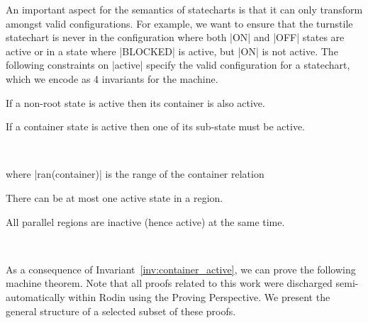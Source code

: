 An important aspect for the semantics of statecharts is that it can only transform amongst valid configurations.  For example, we want to ensure that the turnstile statechart is never in the configuration where both |ON| and |OFF| states are active or in a state where |BLOCKED| is active, but |ON| is not active. The following constraints on |active| specify the valid configuration for a statechart, which we encode as 4 invariants for the machine.
\begin{invariant}
\label{inv:container_active}
If a non-root state is active then its container is also active.
\begin{center}
\end{center}
\end{invariant}
\begin{invariant}
\label{inv:content_active}
If a container state is active then one of its sub-state must be active.
\begin{center}
\\
\end{center}
where |ran(container)| is the range of the container relation
\end{invariant}
\begin{invariant}
\label{inv:active-region-unique}
There can be at most one active state in a region.
\begin{center}
\end{center}
\end{invariant}
\begin{invariant}
\label{inv:active-region-parallel}
All parallel regions are inactive (hence active) at the same time.
\begin{center}
 \\
\end{center}
\end{invariant}
As a consequence of Invariant~\ref{inv:container_active}, we can prove the following machine theorem. Note that all proofs related to this work were discharged semi-automatically within Rodin using the Proving Perspective. We present the general structure of a selected subset of these proofs.
